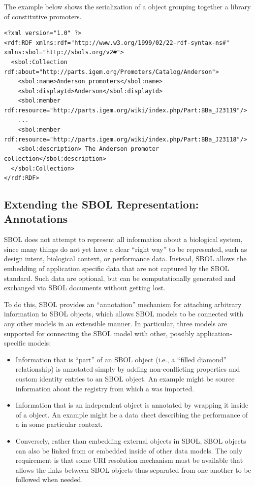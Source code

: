The example below shows the serialization of a  object grouping together a library of constitutive promoters.
\begin{lstlisting}
<?xml version="1.0" ?>
<rdf:RDF xmlns:rdf="http://www.w3.org/1999/02/22-rdf-syntax-ns#" xmlns:sbol="http://sbols.org/v2#">
  <sbol:Collection rdf:about="http://parts.igem.org/Promoters/Catalog/Anderson">
    <sbol:name>Anderson promoters</sbol:name>
    <sbol:displayId>Anderson</sbol:displayId>
    <sbol:member rdf:resource="http://parts.igem.org/wiki/index.php/Part:BBa_J23119"/>
    ...
    <sbol:member rdf:resource="http://parts.igem.org/wiki/index.php/Part:BBa_J23118"/>
    <sbol:description> The Anderson promoter collection</sbol:description>
  </sbol:Collection>
</rdf:RDF>

\end{lstlisting}
\label{ser:Collection}




\subsection{Extending the SBOL Representation:  Annotations}
\label{sec:annotations}

SBOL does not attempt to represent all information about a biological system, since many things do not yet have a clear ``right way'' to be represented, such as design intent, biological context, or performance data.
Instead, SBOL allows the embedding of application specific data that are not captured by the SBOL standard. 
Such data are optional, but can be computationally generated and exchanged via SBOL documents without getting lost. 

To do this, SBOL provides an ``annotation'' mechanism for attaching arbitrary information to SBOL objects, which allows SBOL models to be connected with any other models in an extensible manner.
In particular, three models are supported for connecting the SBOL model with other, possibly application-specific models:
\begin{itemize}
\item Information that is ``part'' of an SBOL object (i.e., a ``filled diamond'' relationship) is annotated simply by adding non-conflicting properties and custom identity entries to an SBOL object.  An example might be source information about the registry from which a  was imported.
\item Information that is an independent object is annotated by wrapping it inside of a  object.  An example might be a data sheet describing the performance of a  in some particular context.
\item Conversely, rather than embedding external objects in SBOL, SBOL objects can also be linked from or embedded inside of other data models.  The only requirement is that some URI resolution mechanism must be available that allows the links between SBOL objects thus separated from one another to be followed when needed.
\end{itemize}

